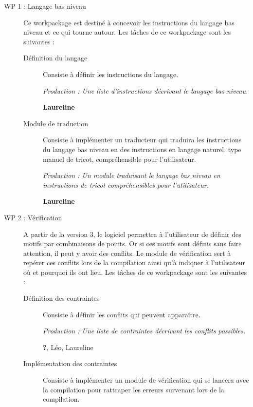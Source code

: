 \documentclass{article}
\begin{document}
\begin{description}
\item[WP 1 : Langage bas niveau] Ce workpackage est destiné à concevoir les instructions du langage bas niveau et ce qui tourne autour. Les tâches de ce workpackage sont les suivantes :

    \begin{description}
    \item[Définition du langage] Consiste à définir les instructions du langage.

      \textit{Production : Une liste d'instructions décrivant le langage bas niveau.}

      \textbf{Laureline}

    \item[Module de traduction] Consiste à implémenter un traducteur qui traduira les instructions du langage bas niveau en des instructions en langage naturel, type manuel de tricot, compréhensible pour l'utilisateur.

      \textit{Production : Un module traduisant le langage bas niveau en instructions de tricot compréhensibles pour l'utilisateur.}

      \textbf{Laureline}
    \end{description}

\medskip

\item[WP 2 : Vérification] A partir de la version 3, le logiciel permettra à l'utilisateur de définir des motifs par combinaisons de points. Or si ces motifs sont définis sans faire attention, il peut y avoir des conflits. Le module de vérification sert à repérer ces conflits lors de la compilation ainsi qu'à indiquer à l'utilisateur où et pourquoi ils ont lieu. Les tâches de ce workpackage sont les suivantes :

    \begin{description}
    \item[Définition des contraintes] Consiste à définir les conflits qui peuvent apparaître.
      
      \textit{Production : Une liste de contraintes décrivant les conflits possibles.}

      \textbf{?}, Léo, Laureline

    \item[Implémentation des contraintes] Consiste à implémenter un module de vérification qui se lancera avec la compilation pour rattraper les erreurs survenant lors de la compilation.
      

\end{description}
\end{description}
\end{document}
